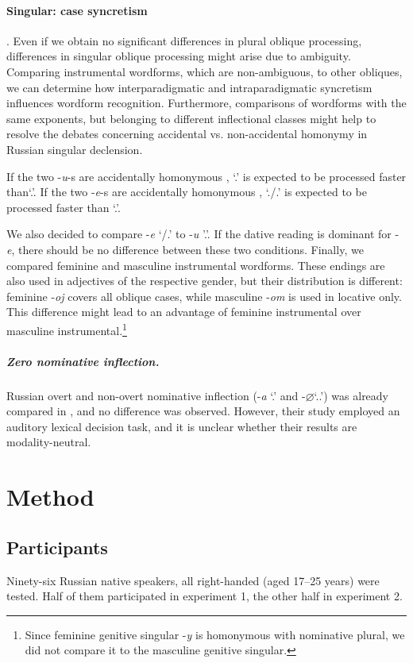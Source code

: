\documentclass[output=paper, modfonts,newtxmath,hidelinks]{langscibook}
\begin{document}
\paragraph*{Singular: case syncretism}. Even if we obtain no significant differences in plural oblique processing, differences in singular oblique processing might arise due to ambiguity. Comparing instrumental wordforms, which are non-ambiguous, to other obliques, we can determine how interparadigmatic and intraparadigmatic syncretism influences wordform recognition. Furthermore, comparisons of wordforms with the same exponents, but belonging to different inflectional classes might help to  resolve the debates concerning accidental vs. non-accidental homo\-nymy in Russian singular declension.

If the two -\textit{u}-s are accidentally homonymous  \citep{wiese2004categories}, `\accc.\fem' is expected to be processed faster than`\datt.\masc'. If the two -\textit{e}-s are accidentally homonymous \citep{muller2004decomposing}, `\datt./\locc.\fem' is expected to be processed faster than `\locc.\masc'.

We also decided to compare -\textit{e} `\datt/\locc.\fem' to -\textit{u} '\datt.\masc'. If the dative reading is dominant for -\textit{e}, there should be no difference between these two conditions. Finally, we compared feminine and masculine instrumental wordforms. These endings are also used in adjectives of the respective gender, but their distribution is different: feminine -\textit{oj} covers all oblique cases, while masculine -\textit{om} is used in locative only. This difference might lead to an advantage of feminine instrumental over masculine instrumental.\footnote{ Since feminine genitive singular -\textit{y} is homonymous with nominative plural, we did not compare it to the masculine genitive singular.}

\subparagraph*{{Zero nominative inflection.}} Russian overt and non-overt nominative inflection (-\textit{a} `\nomm.\fem' and -\textit{$\varnothing$}`\nomm.\accc.\masc') was already compared in \citet{gor2017processing}, and no difference was observed. However, their study employed an auditory lexical decision task, and it is unclear whether their results are modality-neutral.

\section{Method}
\subsection{Participants} Ninety-six Russian native speakers, all right-handed (aged 17–25 years) were tested. Half of them participated in experiment 1, the other half in experiment 2.
\end{document}
